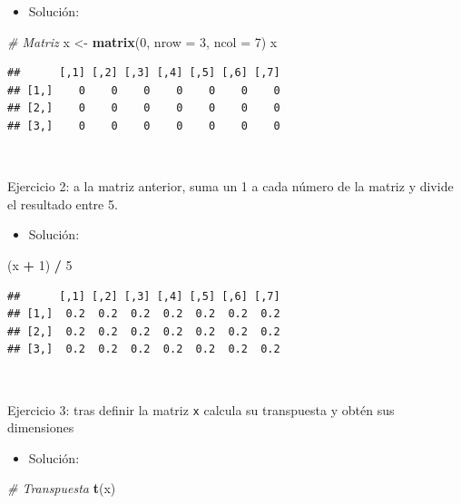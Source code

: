 \documentclass[11pt,]{book}
\newenvironment{Shaded}{\begin{snugshade}}{\end{snugshade}}
\newcommand{\CommentTok}[1]{\textcolor[rgb]{0.37,0.37,0.37}{\textit{#1}}}
\newcommand{\DataTypeTok}[1]{\textcolor[rgb]{0.27,0.27,0.27}{#1}}
\newcommand{\DecValTok}[1]{\textcolor[rgb]{0.06,0.06,0.06}{#1}}
\newcommand{\KeywordTok}[1]{\textcolor[rgb]{0.27,0.27,0.27}{\textbf{#1}}}
\newcommand{\NormalTok}[1]{#1}
\newcommand{\OperatorTok}[1]{\textcolor[rgb]{0.43,0.43,0.43}{\textbf{#1}}}
\newcommand{\StringTok}[1]{\textcolor[rgb]{0.5,0.5,0.5}{#1}}
\providecommand{\tightlist}{%
  \setlength{\itemsep}{0pt}\setlength{\parskip}{0pt}}
\begin{document}
\begin{itemize}
\tightlist
\item
  Solución:
\end{itemize}

\begin{Shaded}
\begin{Highlighting}[]
\CommentTok{# Matriz}
\NormalTok{x <-}\StringTok{ }\KeywordTok{matrix}\NormalTok{(}\DecValTok{0}\NormalTok{, }\DataTypeTok{nrow =} \DecValTok{3}\NormalTok{, }\DataTypeTok{ncol =} \DecValTok{7}\NormalTok{)}
\NormalTok{x}
\end{Highlighting}
\end{Shaded}

\begin{verbatim}
##      [,1] [,2] [,3] [,4] [,5] [,6] [,7]
## [1,]    0    0    0    0    0    0    0
## [2,]    0    0    0    0    0    0    0
## [3,]    0    0    0    0    0    0    0
\end{verbatim}

~

Ejercicio 2: a la matriz anterior, suma un 1 a cada número de la matriz y divide el resultado entre 5.

\begin{itemize}
\tightlist
\item
  Solución:
\end{itemize}

\begin{Shaded}
\begin{Highlighting}[]
\NormalTok{(x }\OperatorTok{+}\StringTok{ }\DecValTok{1}\NormalTok{) }\OperatorTok{/}\StringTok{ }\DecValTok{5}
\end{Highlighting}
\end{Shaded}

\begin{verbatim}
##      [,1] [,2] [,3] [,4] [,5] [,6] [,7]
## [1,]  0.2  0.2  0.2  0.2  0.2  0.2  0.2
## [2,]  0.2  0.2  0.2  0.2  0.2  0.2  0.2
## [3,]  0.2  0.2  0.2  0.2  0.2  0.2  0.2
\end{verbatim}

~

Ejercicio 3: tras definir la matriz \texttt{x} calcula su transpuesta y obtén sus dimensiones

\begin{itemize}
\tightlist
\item
  Solución:
\end{itemize}

\begin{Shaded}
\begin{Highlighting}[]
\CommentTok{# Transpuesta}
\KeywordTok{t}\NormalTok{(x)}
\end{Highlighting}
\end{Shaded}
\end{document}
